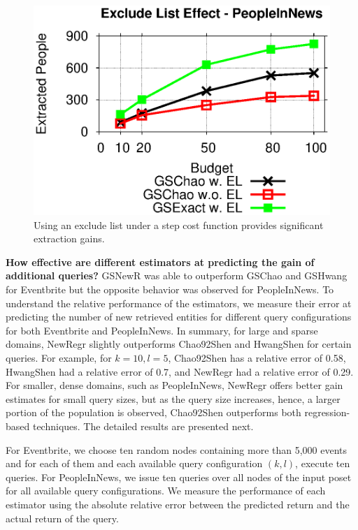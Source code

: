 \begin{figure}[t]
	\begin{center}
	\includegraphics[clip,scale=0.45]{figs/exEffect.eps}
	\caption{Using an exclude list under a step cost function provides significant extraction gains.}
	\label{fig:exEffect}
	\end{center}
	\vspace{-20pt}
\end{figure}

\noindent\textbf{How effective are different estimators at predicting the gain of additional queries?}
GSNewR was able to outperform GSChao and GSHwang for Eventbrite but the opposite behavior was observed for PeopleInNews. To understand the relative performance of the estimators, we measure their error at predicting the number of new retrieved entities for different query configurations for both Eventbrite and PeopleInNews.
In summary, for large and sparse domains, NewRegr slightly outperforms Chao92Shen and HwangShen for certain queries. For example, for $k = 10, l = 5$, Chao92Shen has a relative error of 0.58, HwangShen had a relative error of 0.7, and NewRegr had a relative error of 0.29. For smaller, dense domains, such as PeopleInNews, NewRegr offers better gain estimates for small query sizes, but as the query size increases, hence, a larger portion of the population is observed, Chao92Shen outperforms both regression-based techniques. The detailed results are presented next.

For Eventbrite, we choose ten random nodes containing more than 5,000 events and for each of them and each available query configuration $(k,l)$, execute ten queries. For PeopleInNews, we issue ten queries over all nodes of the input poset for all available query configurations.  We measure the performance of each estimator using the absolute relative error between the predicted return and the actual return of the query.

